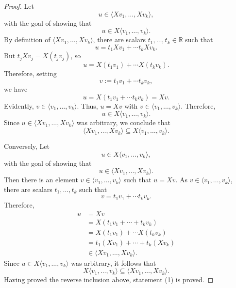 \documentclass[fullpage]{amsart}
\newcommand{\RR}{\mathbb{R}}
\theoremstyle{definition}
\begin{document}
\begin{proof}
Let $$u\in\langle X v_1,\ldots,X v_k\rangle,$$ with the goal of showing that $$u\in X\langle v_1,\ldots,v_k\rangle.$$
By definition of $\langle X v_1,\ldots,X v_k\rangle$, there are scalars $t_1,\ldots,t_k\in\RR$ such that
$$
u=t_1X v_1 + \cdots t_k X v_k.
$$
But $t_jX v_j = X(t_jv_j)$, so 
\[
u = X (t_1v_1) + \cdots X (t_k v_k). 
\]
Therefore, setting $$v:=t_1v_1+\cdots t_kv_k,$$ we have
\[
u = X(t_1v_1+\cdots t_kv_k) = X v.
\]
Evidently, $v\in \langle v_1,\ldots,v_k\rangle$.
Thus, $u=X v$ with $v\in \langle v_1,\ldots,v_k\rangle$. Therefore, $$u\in X\langle v_1,\ldots,v_k\rangle.$$
Since $u\in \langle X v_1,\ldots,X v_k\rangle$ was arbitrary, we conclude that
$$\langle X v_1,\ldots,X v_k\rangle \subseteq X\langle v_1,\ldots,v_k\rangle.$$

Conversely, Let $$u\in X\langle v_1,\ldots, v_k\rangle,$$ with the goal of showing that $$u\in \langle X v_1,\ldots, X v_k\rangle.$$
Then there is an element $v\in \langle v_1,\ldots,v_k\rangle$ such that $u=X v$. As $v\in \langle v_1,\ldots,v_k\rangle$, there are scalars $t_1,\ldots,t_k$ such that $$v=t_1v_1+\cdots t_kv_k.$$
Therefore,
\begin{align*}
u &= X v\\
&= X (t_1v_1+\cdots + t_kv_k)\\
&= X (t_1v_1) + \cdots X (t_kv_k)\\
&= t_1(X v_1) + \cdots + t_k(X v_k)\\
&\in \langle X v_1,\ldots, X v_k\rangle.
\end{align*}
Since $u\in X\langle v_1,\ldots,v_k\rangle$ was arbitrary, it follows that $$
X\langle v_1,\ldots,v_k\rangle
\subseteq
\langle X v_1,\ldots,X v_k\rangle.
$$
Having proved the reverse inclusion above, statement (1) is proved. 

\end{proof}
\end{document}
